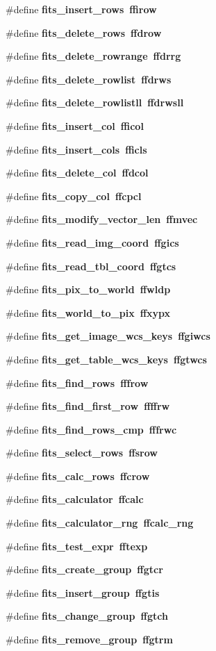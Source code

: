 \begin{CompactItemize}
\#define \bf{fits\_\-insert\_\-rows}~ffirow
\item 
\#define \bf{fits\_\-delete\_\-rows}~ffdrow
\item 
\#define \bf{fits\_\-delete\_\-rowrange}~ffdrrg
\item 
\#define \bf{fits\_\-delete\_\-rowlist}~ffdrws
\item 
\#define \bf{fits\_\-delete\_\-rowlistll}~ffdrwsll
\item 
\#define \bf{fits\_\-insert\_\-col}~fficol
\item 
\#define \bf{fits\_\-insert\_\-cols}~fficls
\item 
\#define \bf{fits\_\-delete\_\-col}~ffdcol
\item 
\#define \bf{fits\_\-copy\_\-col}~ffcpcl
\item 
\#define \bf{fits\_\-modify\_\-vector\_\-len}~ffmvec
\item 
\#define \bf{fits\_\-read\_\-img\_\-coord}~ffgics
\item 
\#define \bf{fits\_\-read\_\-tbl\_\-coord}~ffgtcs
\item 
\#define \bf{fits\_\-pix\_\-to\_\-world}~ffwldp
\item 
\#define \bf{fits\_\-world\_\-to\_\-pix}~ffxypx
\item 
\#define \bf{fits\_\-get\_\-image\_\-wcs\_\-keys}~ffgiwcs
\item 
\#define \bf{fits\_\-get\_\-table\_\-wcs\_\-keys}~ffgtwcs
\item 
\#define \bf{fits\_\-find\_\-rows}~fffrow
\item 
\#define \bf{fits\_\-find\_\-first\_\-row}~ffffrw
\item 
\#define \bf{fits\_\-find\_\-rows\_\-cmp}~fffrwc
\item 
\#define \bf{fits\_\-select\_\-rows}~ffsrow
\item 
\#define \bf{fits\_\-calc\_\-rows}~ffcrow
\item 
\#define \bf{fits\_\-calculator}~ffcalc
\item 
\#define \bf{fits\_\-calculator\_\-rng}~ffcalc\_\-rng
\item 
\#define \bf{fits\_\-test\_\-expr}~fftexp
\item 
\#define \bf{fits\_\-create\_\-group}~ffgtcr
\item 
\#define \bf{fits\_\-insert\_\-group}~ffgtis
\item 
\#define \bf{fits\_\-change\_\-group}~ffgtch
\item 
\#define \bf{fits\_\-remove\_\-group}~ffgtrm
\item 

\end{CompactItemize}
